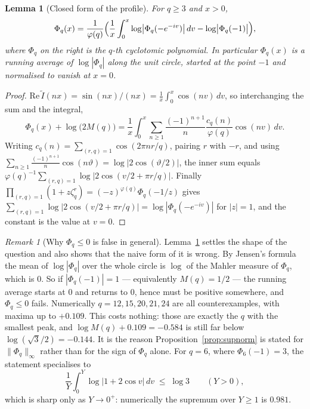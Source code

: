 \documentclass[11pt,a4paper]{article}
\theoremstyle{plain}
\newtheorem{lemma}[theorem]{Lemma}
\theoremstyle{definition}
\theoremstyle{remark}
\newtheorem{remark}[theorem]{Remark}
\begin{document}
\begin{lemma}[Closed form of the profile]\label{lem:closed}
For $q\ge3$ and $x>0$,
\[
  \Phi_q(x)=\frac{1}{\varphi(q)}\Bigl(\frac1x\int_0^{x}
    \log\bigl|\Phi_q(-e^{-iv})\bigr|\,dv-\log\bigl|\Phi_q(-1)\bigr|\Bigr),
\]
where $\Phi_q$ on the right is the $q$-th cyclotomic polynomial. In particular
$\Phi_q(x)$ is a running average of $\log|\Phi_q|$ along the unit circle,
started at the point $-1$ and normalised to vanish at $x=0$.
\end{lemma}

\begin{proof}
$\mathrm{Re}\,\widetilde I(nx)=\sin(nx)/(nx)=\frac1x\int_0^{x}\cos(nv)\,dv$, so
interchanging the sum and the integral,
\[
  \Phi_q(x)+\log\bigl(2M(q)\bigr)
  =\frac1x\int_0^{x}\sum_{n\ge1}\frac{(-1)^{n+1}}{n}\frac{c_q(n)}{\varphi(q)}
     \cos(nv)\,dv .
\]
Writing $c_q(n)=\sum_{(r,q)=1}\cos(2\pi nr/q)$, pairing $r$ with $-r$, and using
$\sum_{n\ge1}\frac{(-1)^{n+1}}{n}\cos(n\vartheta)=\log|2\cos(\vartheta/2)|$, the
inner sum equals $\varphi(q)^{-1}\sum_{(r,q)=1}\log|2\cos(v/2+\pi r/q)|$.
Finally $\prod_{(r,q)=1}(1+z\zeta_q^{r})=(-z)^{\varphi(q)}\Phi_q(-1/z)$ gives
$\sum_{(r,q)=1}\log|2\cos(v/2+\pi r/q)|=\log|\Phi_q(-e^{-iv})|$ for $|z|=1$, and
the constant is the value at $v=0$.
\end{proof}

\begin{remark}[Why $\Phi_q\le0$ is false in general]\label{rem:phipos}
Lemma~\ref{lem:closed} settles the shape of the question and also shows that the
naive form of it is wrong. By Jensen's formula the mean of $\log|\Phi_q|$ over
the whole circle is $\log$ of the Mahler measure of $\Phi_q$, which is $0$. So
if $|\Phi_q(-1)|=1$ --- equivalently $M(q)=1/2$ --- the running average starts at
$0$ and returns to $0$, hence must be positive somewhere, and $\Phi_q\le0$
fails. Numerically $q=12,15,20,21,24$ are all counterexamples, with maxima up to
$+0.109$. This costs nothing: those are exactly the $q$ with the smallest peak,
and $\log M(q)+0.109=-0.584$ is still far below $\log(\sqrt3/2)=-0.144$. It is
the reason Proposition~\ref{prop:supnorm} is stated for
$\|\Phi_q\|_\infty$ rather than for the sign of $\Phi_q$ alone. For $q=6$, where $\Phi_6(-1)=3$, the statement
specialises to
\[
  \frac1Y\int_0^{Y}\log|1+2\cos v|\,dv\;\le\;\log3\qquad(Y>0),
\]
which is sharp only as $Y\to0^{+}$: numerically the supremum over $Y\ge1$ is
$0.981$.
\end{remark}
\end{document}
